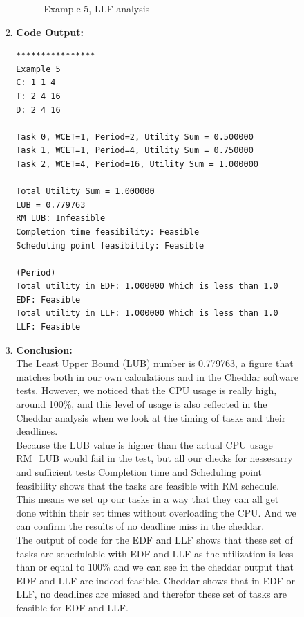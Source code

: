\documentclass[a4paper,11pt]{article}%
\newenvironment{qanda}{\setlength{\parindent}{0pt}}{\bigskip}
\begin{document}
\begin{qanda}
\begin{enumerate}
\begin{enumerate}
\begin{enumerate}
\begin{enumerate}
\begin{figure}[H]
							                  \caption{Example 5, LLF analysis}
						                  \end{figure}


						            \item \textbf{Code Output:}\\
						                  \begin{verbatim}
****************
Example 5
C: 1 1 4
T: 2 4 16
D: 2 4 16

Task 0, WCET=1, Period=2, Utility Sum = 0.500000
Task 1, WCET=1, Period=4, Utility Sum = 0.750000
Task 2, WCET=4, Period=16, Utility Sum = 1.000000

Total Utility Sum = 1.000000
LUB = 0.779763
RM LUB: Infeasible
Completion time feasibility: Feasible
Scheduling point feasibility: Feasible

(Period)
Total utility in EDF: 1.000000 Which is less than 1.0
EDF: Feasible
Total utility in LLF: 1.000000 Which is less than 1.0
LLF: Feasible
										\end{verbatim}
						            \item \textbf{Conclusion:}\\
						                  The Least Upper Bound (LUB) number is 0.779763, a figure that matches both in our own calculations and in the Cheddar software tests. However, we noticed that the CPU usage is really high, around 100\%, and this level of usage is also reflected in the Cheddar analysis when we look at the timing of tasks and their deadlines.\\

						                  Because the LUB value is higher than the actual CPU usage RM\_LUB would fail in the test, but all our checks for nessesarry and sufficient tests Completion time and Scheduling point feasibility shows that the tasks are feasible with RM schedule. This means we set up our tasks in a way that they can all get done within their set times without overloading the CPU. And we can confirm the results of no deadline miss in the cheddar.\\

						                  The output of code for the EDF and LLF shows that these set of tasks are schedulable with EDF and LLF as the utilization is less than or equal to 100\% and we can see in the cheddar output that EDF and LLF are indeed feasible. Cheddar shows that in EDF or LLF, no deadlines are missed and therefor these set of tasks are feasible for EDF and LLF.\\


\end{enumerate}
\end{enumerate}
\end{enumerate}
\end{enumerate}
\end{qanda}
\end{document}
